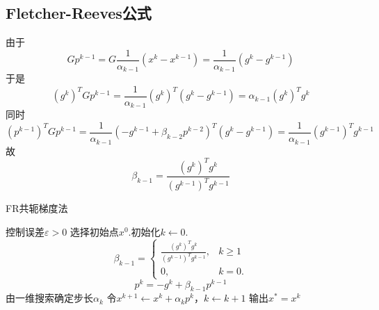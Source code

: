 \subsection{Fletcher-Reeves公式}
由于
\begin{equation*}
	Gp^{k-1} = G\frac{1}{\alpha_{k-1}}(x^k-x^{k-1})=\frac{1}{\alpha_{k-1}}(g^k-g^{k-1})
\end{equation*}
于是
\begin{equation*}
	(g^k)^TGp^{k-1} = \frac{1}{\alpha_{k-1}}(g^k)^T(g^k-g^{k-1}) = {\alpha_{k-1}}(g^k)^T g^k
\end{equation*}
同时
\begin{equation*}
	(p^{k-1})^TGp^{k-1} = \frac{1}{\alpha_{k-1}}(-g^{k-1}+\beta_{k-2}p^{k-2})^T(g^k-g^{k-1}) = \frac{1}{\alpha_{k-1}}(g^{k-1})^Tg^{k-1}
\end{equation*}
故
\begin{equation*}
	\beta_{k-1} = \frac{(g^k)^Tg^k}{(g^{k-1})^Tg^{k-1}}
\end{equation*}
\begin{algorithm}[H]
\caption{FR共轭梯度法}%
\begin{algorithmic}[1]%
\Require 控制误差$\varepsilon > 0$
\State 选择初始点$x^0$.初始化$k \leftarrow 0$.
\State \begin{equation*}
	\beta_{k-1} = \begin{cases}
		\frac{(g^k)^Tg^k}{(g^{k-1})^Tg^{k-1}}, & k\geq 1\\
		0, &k=0.
	\end{cases}
\end{equation*}
\begin{equation*}
		p^k = -g^k + \beta_{k-1}p^{k-1}
\end{equation*}
\State 由一维搜索确定步长$\alpha_k$
\State 令$x^{k+1}\leftarrow x^k + \alpha_k p^k$，$k\leftarrow k+1$
\EndWhile
\State 输出$x^* = x^k$
\end{algorithmic}  
\end{algorithm}
